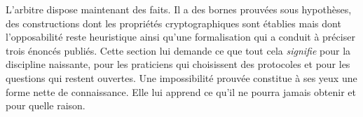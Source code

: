 \begin{boiteArbitre}
L'arbitre dispose maintenant des faits. Il a des bornes prouv\'ees sous hypoth\`eses,
des constructions dont les propri\'et\'es cryptographiques sont \'etablies mais
dont l'opposabilit\'e reste heuristique ainsi qu'une formalisation qui a conduit \`a pr\'eciser
trois \'enonc\'es publi\'es. Cette
section lui demande ce que tout cela \emph{signifie} pour la discipline
naissante, pour les praticiens qui choisissent des protocoles et pour les
questions qui restent ouvertes. Une impossibilit\'e prouv\'ee constitue \`a ses yeux une
forme nette de connaissance. Elle lui apprend ce qu'il ne pourra jamais obtenir
et pour quelle raison.
\end{boiteArbitre}

